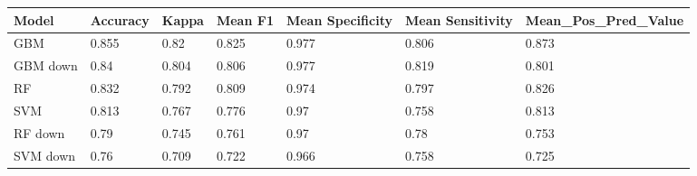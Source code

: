 \begin{tabular}{@{}lllllll@{}}
\toprule
Model    & Accuracy & Kappa & Mean F1 & Mean Specificity & Mean Sensitivity & Mean\_Pos\_Pred\_Value \\ \midrule
GBM      & 0.855    & 0.82  & 0.825   & 0.977            & 0.806            & 0.873                  \\
GBM down & 0.84     & 0.804 & 0.806   & 0.977            & 0.819            & 0.801                  \\
RF       & 0.832    & 0.792 & 0.809   & 0.974            & 0.797            & 0.826                  \\
SVM      & 0.813    & 0.767 & 0.776   & 0.97             & 0.758            & 0.813                  \\
RF down  & 0.79     & 0.745 & 0.761   & 0.97             & 0.78             & 0.753                  \\
SVM down & 0.76     & 0.709 & 0.722   & 0.966            & 0.758            & 0.725                  \\ \bottomrule
\end{tabular}